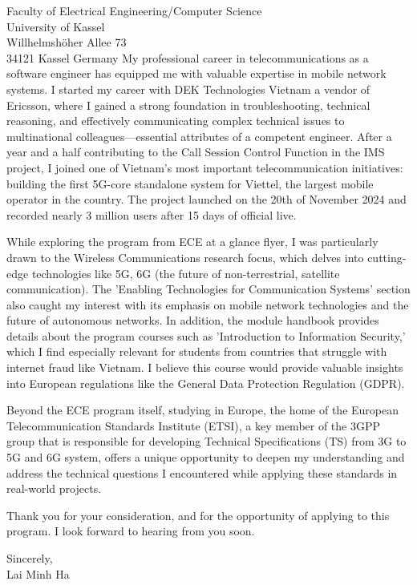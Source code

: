 \documentclass[a4paper,12pt]{letter}
\begin{document}
\begin{letter}{
    Faculty of Electrical Engineering/Computer Science
    \\ University of Kassel
    \\ Willhelmshöher Allee 73
    \\ 34121 Kassel Germany
}
My professional career in telecommunications as a software engineer has equipped me with valuable expertise in mobile network systems. I started my career with DEK Technologies Vietnam a vendor of Ericsson, where I gained a strong foundation in troubleshooting, technical reasoning, and effectively communicating complex technical issues to multinational colleagues—essential attributes of a competent engineer. After a year and a half contributing to the Call Session Control Function in the IMS project, I joined one of Vietnam's most important telecommunication initiatives: building the first 5G-core standalone system for Viettel, the largest mobile operator in the country. The project launched on the 20th of November 2024 and recorded nearly 3 million users after 15 days of official live.

\vspace{1cm}
While exploring the program from ECE at a glance flyer, I was particularly drawn to the Wireless Communications research focus, which delves into cutting-edge technologies like 5G, 6G (the future of non-terrestrial, satellite communication). The 'Enabling Technologies for Communication Systems' section also caught my interest with its emphasis on mobile network technologies and the future of autonomous networks. In addition, the module handbook provides details about the program courses such as 'Introduction to Information Security,' which I find especially relevant for students from countries that struggle with internet fraud like Vietnam. I believe this course would provide valuable insights into European regulations like the General Data Protection Regulation (GDPR).

Beyond the ECE program itself, studying in Europe, the home of the European Telecommunication Standards Institute (ETSI), a key member of the 3GPP group that is responsible for developing Technical Specifications (TS) from 3G to 5G and 6G system, offers a unique opportunity to deepen my understanding and address the technical questions I encountered while applying these standards in real-world projects.

\vspace{1cm}
Thank you for your consideration, and for the opportunity of applying to this program. I look forward to hearing from you soon.

\begin{flushright}
    Sincerely,
    \\ Lai Minh Ha
\end{flushright}

\end{letter}
\end{document}
